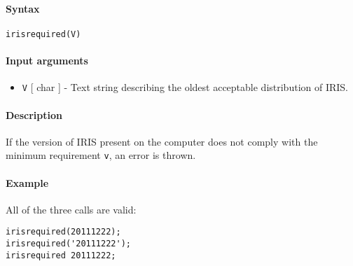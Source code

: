 


	\paragraph{Syntax}

\begin{verbatim}
irisrequired(V)
\end{verbatim}

\paragraph{Input arguments}

\begin{itemize}
\itemsep1pt\parskip0pt
\item
  \texttt{V} {[} char {]} - Text string describing the oldest acceptable
  distribution of IRIS.
\end{itemize}

\paragraph{Description}

If the version of IRIS present on the computer does not comply with the
minimum requirement \texttt{v}, an error is thrown.

\paragraph{Example}

All of the three calls are valid:

\begin{verbatim}
irisrequired(20111222);
irisrequired('20111222');
irisrequired 20111222;
\end{verbatim}


